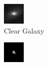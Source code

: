 \documentclass[a4paper,fleqn,usenatbib]{mnras}
\begin{document}
 \begin{figure}

 \begin{subfigure}{0.5\columnwidth}
 \includegraphics[width=\columnwidth]{../Figures/GalaxyExample} 
 \caption{Clear Galaxy}
 \label{fig:Galaxy1}
 \end{subfigure}
 \begin{subfigure}{0.5\columnwidth}
 \includegraphics[width=\columnwidth]{../Figures/StarExample}

\end{subfigure}
\end{figure}
\end{document}

